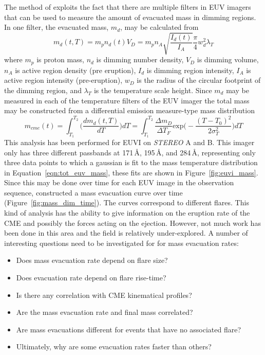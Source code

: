 The method of \citet{aschw09} exploits the fact that there are multiple filters in EUV imagers that can be used to measure the amount of evacuated mass in dimming regions. In one filter, the evacuated mass, $m_d$, may be calculated from
\begin{equation}
m_d(t,T) = m_p n_d(t)V_D = m_p n_A\sqrt{\frac{I_d(t)}{I_A}}\frac{\pi}{4}w_d^2\lambda_T
\end{equation}
where $m_p$ is proton mass, $n_d$ is dimming number density, $V_D$ is dimming volume, $n_A$ is active region density (pre eruption), $I_d$ is dimming region intensity, $I_A$ is active region intensity (pre-eruption), $w_D$ is the radius of the circular footprint of the dimming region, and $\lambda_T$ is the temperature scale height. Since $m_d$ may be measured in each of the temperature filters of the EUV imager the total mass may be constructed from a differential emission measure-type mass distribution
\begin{equation}
m_{cme}(t)=\int_{T_1}^{T_2}\bigg( \frac{dm_d(t,T)}{dT} \bigg)dT = \int_{T_1}^{T_2}\frac{\Delta m_D}{\Delta T_F}\mathrm{exp}\bigg( -\frac{(T-T_0)^2}{2\sigma_T^2} \bigg)dT
\label{eqn:tot_euv_mass}
\end{equation}
This analysis has been performed for EUVI on \emph{STEREO} A and B. This imager only has three different passbands at 171\,\AA, 195\,\AA, and 284\,\AA, representing only three data points to which a gaussian is fit to the mass temperature distribution in Equation~\ref{eqn:tot_euv_mass}, these fits are shown in Figure~\ref{fig:euvi_mass}.
Since this may be done over time for each EUV image in the observation sequence, \citet{aschw09} constructed a mass evacuation curve over time (Figure~\ref{fig:mass_dim_time}). The curves correspond to different flares. This kind of analysis has the ability to give information on the eruption rate of the CME and possibly the forces acting on the ejection. However, not much work has been done in this area and the field is relatively under-explored. A number of interesting questions need to be investigated for for mass evacuation rates:
\begin{itemize}
\item Does mass evacuation rate depend on flare size?
\item Does evacuation rate depend on flare rise-time?
\item Is there any correlation with CME kinematical profiles?
\item Are the mass evacuation rate and final mass correlated?
\item Are mass evacuations different for events that have no associated flare?
\item Ultimately, why are some evacuation rates faster than others?
\end{itemize}
